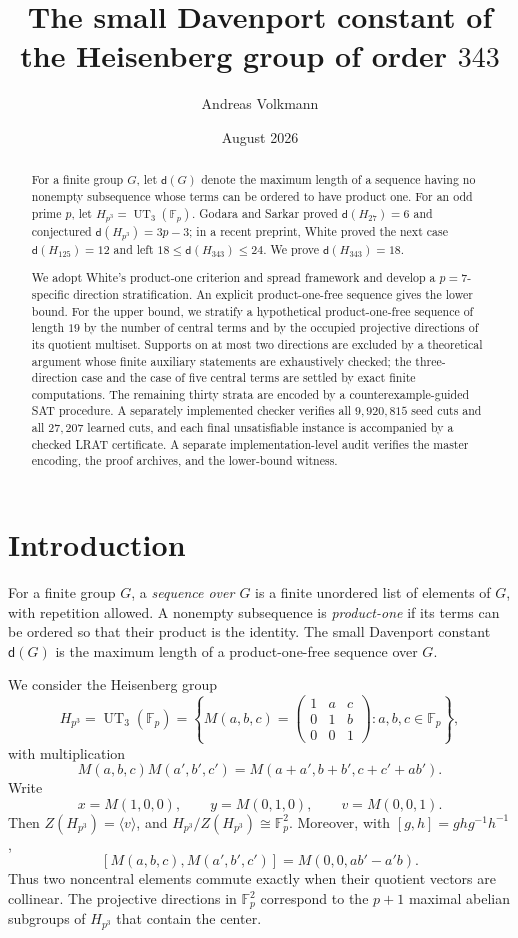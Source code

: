 \documentclass[11pt]{amsart}
\title[The small Davenport constant of $H_{343}$]{The small Davenport constant of the Heisenberg group of order $343$}
\author{Andreas Volkmann}
\date{August 2026}
\theoremstyle{definition}
\newcommand{\F}{\mathbb F}
\newcommand{\dd}{\mathsf d}
\begin{document}
\begin{abstract}
For a finite group $G$, let $\dd(G)$ denote the maximum length of a
sequence having no nonempty subsequence whose terms can be ordered to
have product one.  For an odd prime $p$, let
$H_{p^3}=\operatorname{UT}_3(\F_p)$.  Godara and Sarkar proved
$\dd(H_{27})=6$ and conjectured $\dd(H_{p^3})=3p-3$; in a recent
preprint, White proved the next case $\dd(H_{125})=12$ and left
$18\leq\dd(H_{343})\leq24$.  We prove $\dd(H_{343})=18$.

We adopt White's product-one criterion and spread framework and develop
a $p=7$-specific direction stratification.  An explicit
product-one-free sequence gives the lower bound.  For the upper bound,
we stratify a hypothetical product-one-free sequence of length $19$ by
the number of central terms and by the occupied projective directions
of its quotient multiset.  Supports on at most two directions are
excluded by a theoretical argument whose finite auxiliary statements
are exhaustively checked; the three-direction case and the case of five
central terms are settled by exact finite computations.  The remaining
thirty strata are encoded by a counterexample-guided SAT procedure.  A
separately implemented checker verifies all $9{,}920{,}815$ seed cuts
and all $27{,}207$ learned cuts, and each final unsatisfiable instance
is accompanied by a checked LRAT certificate.  A separate
implementation-level audit verifies the master encoding, the proof
archives, and the lower-bound witness.
\end{abstract}

\maketitle
\enlargethispage{\baselineskip}

\section{Introduction}

For a finite group $G$, a \emph{sequence over $G$} is a finite unordered list of elements of $G$, with repetition allowed. A nonempty subsequence is \emph{product-one} if its terms can be ordered so that their product is the identity. The small Davenport constant $\dd(G)$ is the maximum length of a product-one-free sequence over $G$.

We consider the Heisenberg group
\[
H_{p^3}=\operatorname{UT}_3(\F_p)
 =\left\{M(a,b,c)=
\begin{pmatrix}
1&a&c\\0&1&b\\0&0&1
\end{pmatrix}:a,b,c\in\F_p\right\},
\]
with multiplication
\[
M(a,b,c)M(a',b',c')=M(a+a',b+b',c+c'+ab').
\]
Write
\[
x=M(1,0,0),\qquad y=M(0,1,0),\qquad v=M(0,0,1).
\]
Then $Z(H_{p^3})=\langle v\rangle$, and $H_{p^3}/Z(H_{p^3})\cong\F_p^2$.
Moreover, with $[g,h]=ghg^{-1}h^{-1}$,
\[
[M(a,b,c),M(a',b',c')]=M(0,0,ab'-a'b).
\]
Thus two noncentral elements commute exactly when their quotient
vectors are collinear.  The projective
directions in $\F_p^2$ correspond to the $p+1$ maximal abelian
subgroups of $H_{p^3}$ that contain the center.
\end{document}
